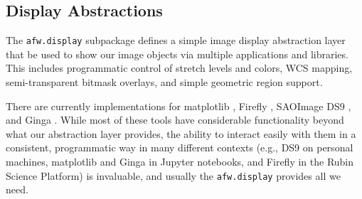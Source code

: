 \subsection{Display Abstractions}
\label{sec:display}

The \texttt{afw.display} subpackage defines a simple image display abstraction layer that be used to show our image objects via multiple applications and libraries.
This includes programmatic control of stretch levels and colors, WCS mapping, semi-transparent bitmask overlays, and simple geometric region support.

There are currently implementations for matplotlib \citep{2007CSE.....9...90H}, Firefly \citep{2020ASPC..527..243R}, SAOImage DS9 \citep{2003ASPC..295..489J}, and Ginga \citep[][via Astrowidgets]{2013ASPC..475..319J}.
While most of these tools have considerable functionality beyond what our abstraction layer provides, the ability to interact easily with them in a consistent, programmatic way in many different contexts (e.g., DS9 on personal machines, matplotlib and Ginga in Jupyter notebooks, and Firefly in the Rubin Science Platform) is invaluable, and usually the \texttt{afw.display} provides all we need.

